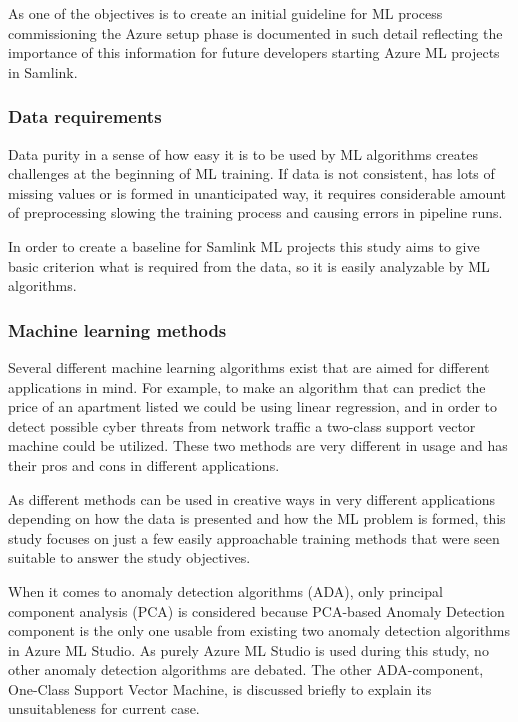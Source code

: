 As one of the objectives is to create
an initial guideline for ML process commissioning
the Azure setup phase is documented in such detail
reflecting the importance of this information
for future developers
starting Azure ML projects in Samlink.


\subsubsection*{Data requirements}
Data purity in a sense of
how easy it is to be used by ML algorithms
creates challenges at the beginning of ML training.
If data is not consistent,
has lots of missing values
or is formed in unanticipated way,
it requires considerable amount of preprocessing
slowing the training process
and causing errors in pipeline runs.

In order to create a baseline for Samlink ML projects
this study aims to give basic criterion
what is required from the data,
so it is easily analyzable by ML algorithms.


\subsubsection*{Machine learning methods}
Several different machine learning algorithms exist
that are aimed for different applications in mind.
For example,
to make an algorithm that can predict
the price of an apartment listed\cite{winky}
we could be using linear regression,
and in order to detect
possible cyber threats from network traffic\cite{ghanem}
a two-class support vector machine could be utilized.
These two methods are very different in usage
and has their pros and cons in different applications.

As different methods can be used in creative ways
in very different applications
depending on how the data is presented
and how the ML problem is formed,
this study focuses on
just a few easily approachable training methods
that were seen suitable to answer the study objectives.

When it comes to anomaly detection algorithms (ADA),
only principal component analysis (PCA) is considered
because PCA-based Anomaly Detection component is the only one usable
from existing two anomaly detection algorithms
in Azure ML Studio.
As purely Azure ML Studio is used during this study,
no other anomaly detection algorithms are debated.
The other ADA-component,
One-Class Support Vector Machine,
is discussed briefly to explain its unsuitableness for current case.


